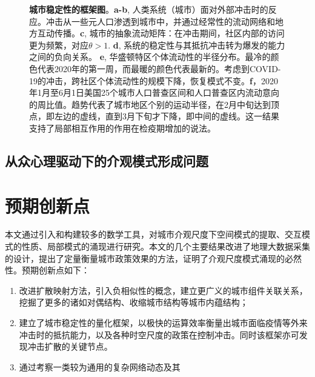 \begin{figure}
    \caption{\textbf{城市稳定性的框架图}。\textbf{a-b}, 人类系统（城市）面对外部冲击时的反应。冲击从一些元人口渗透到城市中，并通过经常性的流动网络和地方互动传播。\textbf{c}, 城市的抽象流动矩阵：在冲击期间，社区内部的访问更为频繁，对应$\theta > 1$. \textbf{d}, 系统的稳定性与其抵抗冲击转为爆发的能力之间的负向关系。 \textbf{e}, 华盛顿特区个体流动性的半径分布。最冷的颜色代表2020年的第一周，而最暖的颜色代表最新的。考虑到COVID-19的冲击，跨社区个体流动性的规模下降，恢复模式不变。\textbf{f}，2020年1月至6月1日美国25个城市人口普查区间和人口普查区内流动意向的周比值。趋势代表了城市地区个别的运动半径，在2月中旬达到顶点，即左边的虚线，直到3月下旬才下降，即中间的虚线。这一结果支持了局部相互作用的作用在检疫期增加的说法。}
    \label{fig:allee1}
\end{figure}

\subsection{从众心理驱动下的介观模式形成问题}



\section{预期创新点}

本文通过引入和构建较多的数学工具，对城市介观尺度下空间模式的提取、交互模式的性质、局部模式的涌现进行研究。本文的几个主要结果改进了地理大数据采集的设计，提出了定量衡量城市政策效果的方法，证明了介观尺度模式涌现的必然性。预期创新点如下：\begin{enumerate}
    \item 改进扩散映射方法，引入负相似性的概念，建立更广义的城市组件关联关系，挖掘了更多的诸如对偶结构、收缩城市结构等城市内蕴结构；
    \item 建立了城市稳定性的量化框架，以极快的运算效率衡量出城市面临疫情等外来冲击时的抵抗能力，以及各种时空尺度的政策在控制冲击。同时该框架亦可发现冲击扩散的关键节点。
    \item 通过考察一类较为通用的复杂网络动态及其
\end{enumerate}